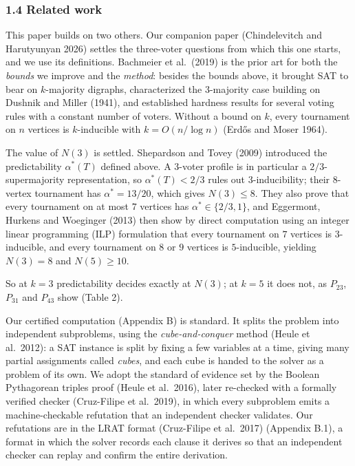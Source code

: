 \documentclass[
]{article}
\begin{document}
\subsubsection{1.4 Related work}\label{related-work}

This paper builds on two others. Our companion paper (Chindelevitch and
Harutyunyan 2026) settles the three-voter questions from which this one
starts, and we use its definitions. Bachmeier et al.~(2019) is the prior
art for both the \emph{bounds} we improve and the \emph{method}: besides
the bounds above, it brought SAT to bear on \(k\)-majority digraphs,
characterized the \(3\)-majority case building on Dushnik and Miller
(1941), and established hardness results for several voting rules with a
constant number of voters. Without a bound on \(k\), every tournament on
\(n\) vertices is \(k\)-inducible with \(k = O(n/\log n)\) (Erdős and
Moser 1964).

The value of \(N(3)\) is settled. Shepardson and Tovey (2009) introduced
the predictability \(\alpha^{*}(T)\) defined above. A \(3\)-voter
profile is in particular a \(2/3\)-supermajority representation, so
\(\alpha^{*}(T) < 2/3\) rules out \(3\)-inducibility; their \(8\)-vertex
tournament has \(\alpha^{*} = 13/20\), which gives \(N(3) \le 8\). They
also prove that every tournament on at most \(7\) vertices has
\(\alpha^{*} \in \{2/3, 1\}\), and Eggermont, Hurkens and Woeginger
(2013) then show by direct computation using an integer linear
programming (ILP) formulation that every tournament on \(7\) vertices is
\(3\)-inducible, and every tournament on \(8\) or \(9\) vertices is
\(5\)-inducible, yielding \(N(3) = 8\) and \(N(5) \ge 10\).

So at \(k = 3\) predictability decides exactly at \(N(3)\); at \(k = 5\)
it does not, as \(P_{23}\), \(P_{31}\) and \(P_{43}\) show (Table 2).

Our certified computation (Appendix B) is standard. It splits the
problem into independent subproblems, using the \emph{cube-and-conquer}
method (Heule et al.~2012): a SAT instance is split by fixing a few
variables at a time, giving many partial assignments called
\emph{cubes}, and each cube is handed to the solver as a problem of its
own. We adopt the standard of evidence set by the Boolean Pythagorean
triples proof (Heule et al.~2016), later re-checked with a formally
verified checker (Cruz-Filipe et al.~2019), in which every subproblem
emits a machine-checkable refutation that an independent checker
validates. Our refutations are in the LRAT format (Cruz-Filipe et
al.~2017) (Appendix B.1), a format in which the solver records each
clause it derives so that an independent checker can replay and confirm
the entire derivation.
\end{document}
